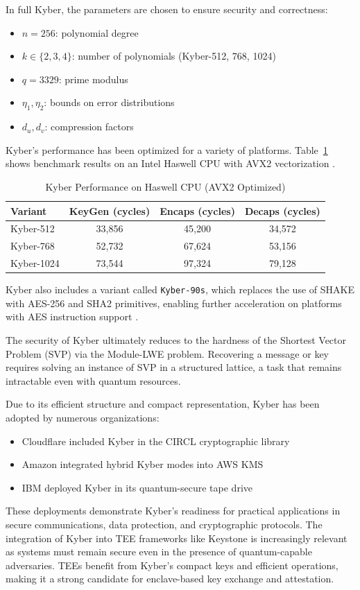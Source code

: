 In full Kyber, the parameters are chosen to ensure security and correctness:
\begin{itemize}
    \item $n = 256$: polynomial degree
    \item $k \in \{2, 3, 4\}$: number of polynomials (Kyber-512, 768, 1024)
    \item $q = 3329$: prime modulus
    \item $\eta_1, \eta_2$: bounds on error distributions
    \item $d_u, d_v$: compression factors
\end{itemize}

Kyber’s performance has been optimized for a variety of platforms. Table~\ref{tab:kyber_perf} shows benchmark results on an Intel Haswell CPU with AVX2 vectorization \cite{kyber2024}. %

\begin{table}[h]
\centering
\caption{Kyber Performance on Haswell CPU (AVX2 Optimized)}
\label{tab:kyber_perf}
\begin{tabular}{|l|c|c|c|}
\hline
\textbf{Variant} & \textbf{KeyGen (cycles)} & \textbf{Encaps (cycles)} & \textbf{Decaps (cycles)} \\
\hline
Kyber-512 & 33,856 & 45,200 & 34,572 \\
Kyber-768 & 52,732 & 67,624 & 53,156 \\
Kyber-1024 & 73,544 & 97,324 & 79,128 \\
\hline
\end{tabular}
\end{table}

Kyber also includes a variant called \texttt{Kyber-90s}, which replaces the use of SHAKE with AES-256 and SHA2 primitives, enabling further acceleration on platforms with AES instruction support \cite{kyber2024}. %

The security of Kyber ultimately reduces to the hardness of the Shortest Vector Problem (SVP) via the Module-LWE problem. Recovering a message or key requires solving an instance of SVP in a structured lattice, a task that remains intractable even with quantum resources\cite{kyber2021}. %

Due to its efficient structure and compact representation, Kyber has been adopted by numerous organizations:
\begin{itemize}
    \item Cloudflare included Kyber in the CIRCL cryptographic library
    \item Amazon integrated hybrid Kyber modes into AWS KMS
    \item IBM deployed Kyber in its quantum-secure tape drive
\end{itemize} %
These deployments demonstrate Kyber’s readiness for practical applications in secure communications, data protection, and cryptographic protocols. 
The integration of Kyber into TEE frameworks like Keystone is increasingly relevant as systems must remain secure even in the presence of quantum-capable adversaries. TEEs benefit from Kyber’s compact keys and efficient operations, making it a strong candidate for enclave-based key exchange and attestation.

